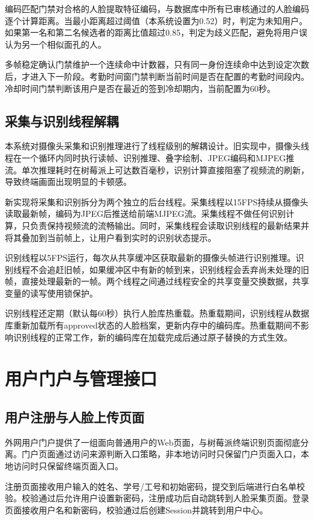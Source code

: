 编码匹配门禁对合格的人脸提取特征编码，与数据库中所有已审核通过的人脸编码逐个计算距离。当最小距离超过阈值（本系统设置为0.52）时，判定为未知用户。如果第一名和第二名候选者的距离比值超过0.85，判定为歧义匹配，避免将用户误认为另一个相似面孔的人。

多帧稳定确认门禁维护一个连续命中计数器，只有同一身份连续命中达到设定次数后，才进入下一阶段。考勤时间窗门禁判断当前时间是否在配置的考勤时间段内。冷却时间门禁判断该用户是否在最近的签到冷却期内，当前配置为60秒。

\subsection{采集与识别线程解耦}

本系统对摄像头采集和识别推理进行了线程级别的解耦设计。旧实现中，摄像头线程在一个循环内同时执行读帧、识别推理、叠字绘制、JPEG编码和MJPEG推流。单次推理耗时在树莓派上可达数百毫秒，识别计算直接阻塞了视频流的刷新，导致终端画面出现明显的卡顿感。

新实现将采集和识别拆分为两个独立的后台线程。采集线程以15FPS持续从摄像头读取最新帧，编码为JPEG后推送给前端MJPEG流。采集线程不做任何识别计算，只负责保持视频流的流畅输出。同时，采集线程会读取识别线程的最新结果并将其叠加到当前帧上，让用户看到实时的识别状态提示。

识别线程以5FPS运行，每次从共享缓冲区获取最新的摄像头帧进行识别推理。识别线程不会追赶旧帧，如果缓冲区中有新的帧到来，识别线程会丢弃尚未处理的旧帧，直接处理最新的一帧。两个线程之间通过线程安全的共享变量交换数据，共享变量的读写使用锁保护。

识别线程还定期（默认每60秒）执行人脸库热重载。热重载期间，识别线程从数据库重新加载所有approved状态的人脸档案，更新内存中的编码库。热重载期间不影响识别线程的正常工作，新的编码库在加载完成后通过原子替换的方式生效。

\section{用户门户与管理接口}

\subsection{用户注册与人脸上传页面}

外网用户门户提供了一组面向普通用户的Web页面，与树莓派终端识别页面彻底分离。门户页面通过访问来源判断入口策略，非本地访问时只保留门户页面入口，本地访问时只保留终端页面入口。

注册页面接收用户输入的姓名、学号/工号和初始密码，提交到后端进行白名单校验。校验通过后允许用户设置新密码，注册成功后自动跳转到人脸采集页面。登录页面接收用户名和新密码，校验通过后创建Session并跳转到用户中心。

